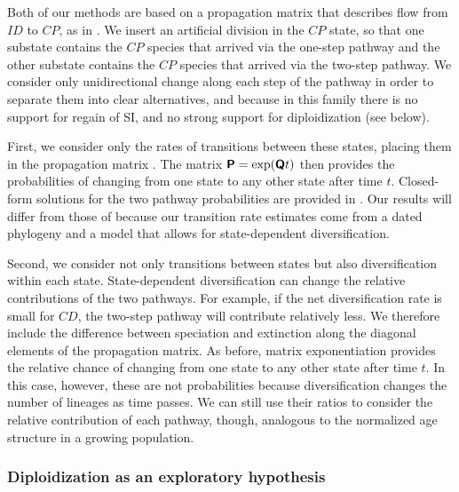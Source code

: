 Both of our methods are based on a propagation matrix that describes flow from $ID$ to $CP$, as in \citet{robertson_2011}.
We insert an artificial division in the $CP$ state, so that one substate contains the $CP$ species that arrived via the one-step pathway and the other substate contains the $CP$ species that arrived via the two-step pathway.
We consider only unidirectional change along each step of the pathway in order to separate them into clear alternatives, and because in this family there is no support for regain of SI, and no strong support for diploidization (see below).

First, we consider only the rates of transitions between these states, placing them in the propagation matrix .
The matrix $\bm{\mathsf{P}} = \exp(\bm{\mathsf{Q}} t)$ then provides the probabilities of changing from one state to any other state after time $t$.
Closed-form solutions for the two pathway probabilities are provided in \citet{robertson_2011}.
Our results will differ from those of \citet{robertson_2011} because our transition rate estimates come from a dated phylogeny and a model that allows for state-dependent diversification.

Second, we consider not only transitions between states but also diversification within each state.
State-dependent diversification can change the relative contributions of the two pathways.
For example, if the net diversification rate is small for $CD$, the two-step pathway will contribute relatively less.
We therefore include the difference between speciation and extinction along the diagonal elements of the propagation matrix.
As before, matrix exponentiation provides the relative chance of changing from one state to any other state after time $t$.
In this case, however, these are not probabilities because diversification changes the number of lineages as time passes.
We can still use their ratios to consider the relative contribution of each pathway, though, analogous to the normalized age structure in a growing population. %


\subsubsection{Diploidization as an exploratory hypothesis}

